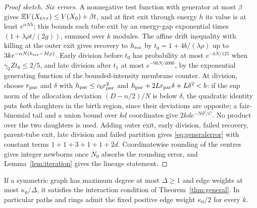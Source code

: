 \begin{proof}[Proof sketch]
\emph{Six errors.} A nonnegative test function with generator at most $\beta$ gives $\mathbb E V(X_{t\wedge\tau})\le V(X_0)+\beta t$, and at first exit through energy $h$ its value is at least $e^{\alpha Nh}$; this bounds each tube exit by an energy-gap exponential times $(1+\lambda\rho t/(2g))$, summed over $k$ modules. The affine drift inequality with killing at the outer exit gives recovery to $h_{\rm rec}$ by $t_0=1+4b/(\lambda\rho)$ up to $3ke^{-\alpha N(h_{\rm rec}-M\rho)}$. Early division before $t_0$ has probability at most $e^{-kN/125}$ when $\gamma_0Zt_0\le2/5$, and late division after $t_1$ at most $e^{-9kN/4000}$, by the exponential generating function of the bounded-intensity membrane counter. At division, choose $r_{\rm par}$ and $\delta$ with $h_{\rm par}\le c_0r_{\rm par}^2$ and $h_{\rm par}+2Lr_{\rm par}\delta+L\delta^2<b$: if the sup norm of the allocation deviation $(D-n/2)/N$ is below $\delta$, the quadratic identity puts \emph{both} daughters in the birth region, since their deviations are opposite; a fair-binomial tail and a union bound over $kd$ coordinates give $2kde^{-N\delta^2/C}$. No product over the two daughters is used. Adding outer exit, early division, failed recovery, parent-tube exit, late division and failed partition gives \eqref{eq:generalerror} with constant terms $1+1+3+1+1+2d$. Coordinatewise rounding of the centres gives integer newborns once $N_0$ absorbs the rounding error, and Lemma~\ref{lem:iteration} gives the lineage statement.
\end{proof}

\begin{corollary}\label{cor:degree}
If a symmetric graph has maximum degree at most $\Delta\ge1$ and edge weights at most $\kappa_0/\Delta$, it satisfies the interaction condition of Theorem~\ref{thm:general}. In particular paths and rings admit the fixed positive edge weight $\kappa_0/2$ for every $k$.
\end{corollary}

